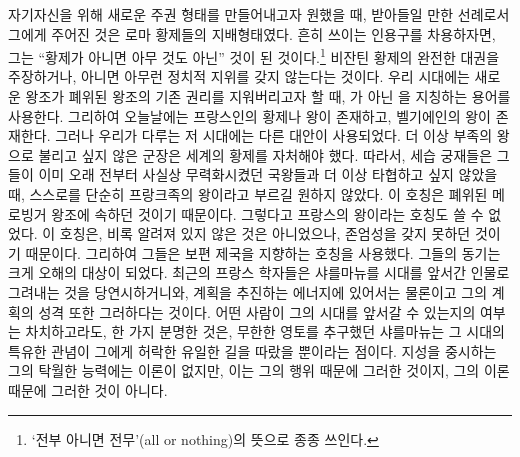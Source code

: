 자기자신을 위해 새로운 주권 형태를 만들어내고자 원했을 때,
받아들일 만한 선례로서 그에게 주어진 것은 로마 황제들의 지배형태였다.
흔히 쓰이는 인용구를 차용하자면, 그는
``황제가 아니면 아무 것도 아닌'' 것이
된 것이다.\footnote{`전부 아니면 전무'(all or nothing)의 뜻으로 종종 쓰인다.}
비잔틴 황제의 완전한 대권을 주장하거나, 아니면 아무런 정치적 지위를
갖지 않는다는 것이다.
우리 시대에는 새로운 왕조가 폐위된 왕조의 기존 권리를 지워버리고자 할 때,
가 아닌 을 지칭하는 용어를 사용한다.
그리하여 오늘날에는 프랑스인의 황제나 왕이 존재하고,
벨기에인의 왕이 존재한다.
그러나 우리가 다루는 저 시대에는 다른 대안이 사용되었다.
더 이상 부족의 왕으로 불리고 싶지 않은 군장은 세계의 황제를 자처해야 했다.
따라서, 세습 궁재들은 그들이 이미 오래 전부터 사실상
무력화시켰던 국왕들과 더 이상 타협하고 싶지 않았을 때,
스스로를 단순히 프랑크족의 왕이라고 부르길 원하지 않았다.
이 호칭은 폐위된 메로빙거 왕조에 속하던 것이기 때문이다.
그렇다고 프랑스의 왕이라는 호칭도 쓸 수 없었다.
이 호칭은,
비록 알려져 있지 않은 것은 아니었으나, 존엄성을 갖지 못하던 것이기 때문이다.
그리하여 그들은 보편 제국을 지향하는 호칭을 사용했다.
그들의 동기는 크게 오해의 대상이 되었다.
최근의 프랑스 학자들은 샤를마뉴를 시대를 앞서간 인물로 그려내는 것을
당연시하거니와,
계획을 추진하는 에너지에 있어서는 물론이고
그의 계획의 성격 또한 그러하다는 것이다.
어떤 사람이 그의 시대를 앞서갈 수 있는지의 여부는 차치하고라도,
한 가지 분명한 것은, 무한한 영토를 추구했던 샤를마뉴는
그 시대의 특유한 관념이 그에게 허락한 유일한 길을 따랐을 뿐이라는 점이다.
지성을 중시하는 그의 탁월한 능력에는 이론이 없지만,
이는 그의 행위 때문에 그러한 것이지, 그의 이론 때문에 그러한 것이 아니다.

